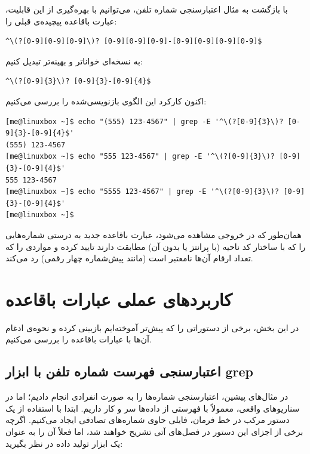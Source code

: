 با بازگشت به مثال اعتبارسنجی شماره تلفن، می‌توانیم با بهره‌گیری از این قابلیت، عبارت باقاعده پیچیده‌ی قبلی را:

\begin{latin}
\begin{lstlisting}
^\(?[0-9][0-9][0-9]\)? [0-9][0-9][0-9]-[0-9][0-9][0-9][0-9]$
\end{lstlisting}
\end{latin}

به نسخه‌ای خواناتر و بهینه‌تر تبدیل کنیم:

\begin{latin}
\begin{lstlisting}
^\(?[0-9]{3}\)? [0-9]{3}-[0-9]{4}$
\end{lstlisting}
\end{latin}

اکنون کارکرد این الگوی بازنویسی‌شده را بررسی می‌کنیم:

\begin{latin}
\begin{lstlisting}
[me@linuxbox ~]$ echo "(555) 123-4567" | grep -E '^\(?[0-9]{3}\)? [0-9]{3}-[0-9]{4}$'
(555) 123-4567
[me@linuxbox ~]$ echo "555 123-4567" | grep -E '^\(?[0-9]{3}\)? [0-9]{3}-[0-9]{4}$'
555 123-4567
[me@linuxbox ~]$ echo "5555 123-4567" | grep -E '^\(?[0-9]{3}\)? [0-9]{3}-[0-9]{4}$'
[me@linuxbox ~]$
\end{lstlisting}
\end{latin}

همان‌طور که در خروجی مشاهده می‌شود، عبارت باقاعده جدید به درستی شماره‌هایی را که با ساختار کد ناحیه (با پرانتز یا بدون آن) مطابقت دارند تایید کرده و مواردی را که تعداد ارقام آن‌ها نامعتبر است (مانند پیش‌شماره چهار رقمی) رد می‌کند.

\section{کاربردهای عملی عبارات باقاعده}

در این بخش، برخی از دستوراتی را که پیش‌تر آموخته‌ایم بازبینی کرده و نحوه‌ی ادغام آن‌ها با عبارات باقاعده را بررسی می‌کنیم.

\subsection{اعتبارسنجی فهرست شماره تلفن با ابزار grep}

در مثال‌های پیشین، اعتبارسنجی شماره‌ها را به صورت انفرادی انجام دادیم؛ اما در سناریوهای واقعی، معمولاً با فهرستی از داده‌ها سر و کار داریم. ابتدا با استفاده از یک دستور مرکب در خط فرمان، فایلی حاوی شماره‌های تصادفی ایجاد می‌کنیم. اگرچه برخی از اجزای این دستور در فصل‌های آتی تشریح خواهند شد، اما فعلاً آن را به عنوان یک ابزار تولید داده در نظر بگیرید:

